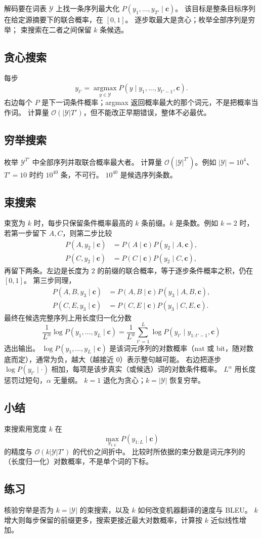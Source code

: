 解码要在词表 $\mathcal{Y}$ 上找一条序列最大化
$P(y_1,\ldots,y_{T'}\mid\bm{c})$。
该目标是整条目标序列在给定源摘要下的联合概率，在 $[0,1]$。
逐步取最大是贪心；枚举全部序列是穷举；
束搜索在二者之间保留 $k$ 条候选。

\subsection{贪心搜索}

每步
\[
y_{t'}=\operatorname*{argmax}_{y\in\mathcal{Y}}P(y \mid y_1,\ldots,y_{t'-1},\bm{c}).
\]
右边每个 $P$ 是下一词条件概率；argmax 返回概率最大的那个词元，不是把概率当作词。
计算量 $\mathcal{O}(|\mathcal{Y}|T')$，但不能改正早期错误，整体不必最优。

\subsection{穷举搜索}

枚举 $\mathcal{Y}^{T'}$ 中全部序列并取联合概率最大者。
计算量 $\mathcal{O}(|\mathcal{Y}|^{T'})$。例如 $|\mathcal{Y}|=10^{4}$、$T'=10$ 时约 $10^{40}$ 条，不可行。
$10^{40}$ 是候选序列条数。

\subsection{束搜索}

束宽为 $k$ 时，每步只保留条件概率最高的 $k$ 条前缀。$k$ 是条数。例如 $k=2$ 时，
若第一步留下 $A,C$，则第二步比较
\begin{align*}
P(A,y_2 \mid \bm{c})&=P(A \mid \bm{c})P(y_2 \mid A,\bm{c}),
\\
P(C,y_2 \mid \bm{c})&=P(C \mid \bm{c})P(y_2 \mid C,\bm{c}),
\end{align*}
再留下两条。左边是长度为 $2$ 的前缀的联合概率，等于逐步条件概率之积，仍在 $[0,1]$。
第三步同理，
\begin{align*}
P(A,B,y_3 \mid \bm{c})&=P(A,B \mid \bm{c})P(y_3 \mid A,B,\bm{c}),
\\
P(C,E,y_3 \mid \bm{c})&=P(C,E \mid \bm{c})P(y_3 \mid C,E,\bm{c}).
\end{align*}
最终在候选完整序列上用长度归一化分数
\[
\frac{1}{L^{\alpha}}\log P(y_1,\ldots,y_L \mid \bm{c})
=
\frac{1}{L^{\alpha}}\sum_{t'=1}^{L}\log P(y_{t'} \mid y_{1:t'-1},\bm{c})
\]
选出输出。
$\log P(y_1,\ldots,y_L\mid\bm{c})$ 是该词元序列的对数概率（nat 或 bit，随对数底而定），通常为负，越大（越接近 $0$）表示整句越可能。
右边把逐步 $\log P(y_{t'}\mid\cdot)$ 相加，每项是该步真实（或候选）词的对数条件概率。
$L^{\alpha}$ 用长度惩罚过短句，$\alpha$ 无量纲。
$k=1$ 退化为贪心；$k=|\mathcal{Y}|$ 恢复穷举。

\subsection{小结}

束搜索用宽度 $k$ 在
\[
\max_{y_{1:L}}P(y_{1:L}\mid\bm{c})
\]
的精度与 $\mathcal{O}(k|\mathcal{Y}|T')$ 的代价之间折中。
比较时所依据的束分数是词元序列的（长度归一化）对数概率，不是单个词的下标。

\subsection{练习}

核验穷举是否为 $k=|\mathcal{Y}|$ 的束搜索，以及 $k$ 如何改变机器翻译的速度与 BLEU。
$k$ 增大则每步保留的前缀更多，搜索更接近最大对数概率，计算按 $k$ 近似线性增加。
